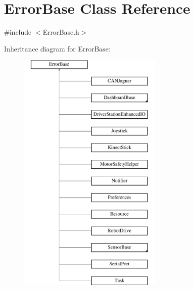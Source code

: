 \hypertarget{classErrorBase}{
\section{ErrorBase Class Reference}
\label{classErrorBase}
}


{\ttfamily \#include $<$ErrorBase.h$>$}

Inheritance diagram for ErrorBase:\begin{figure}[H]
\begin{center}
\leavevmode
\includegraphics[height=12.000000cm]{classErrorBase}
\end{center}
\end{figure}
